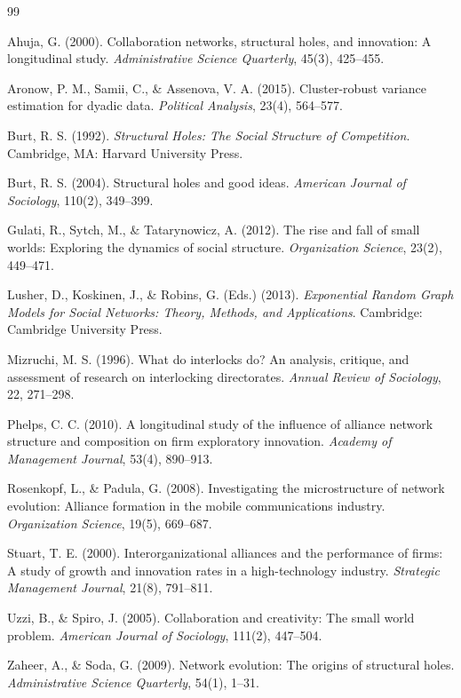 \documentclass[12pt]{article}
\begin{document}
\singlespacing
\begin{thebibliography}{99}
\small

Ahuja, G. (2000). Collaboration networks, structural holes, and innovation: A longitudinal study. \textit{Administrative Science Quarterly}, 45(3), 425--455.

Aronow, P. M., Samii, C., \& Assenova, V. A. (2015). Cluster-robust variance estimation for dyadic data. \textit{Political Analysis}, 23(4), 564--577.

Burt, R. S. (1992). \textit{Structural Holes: The Social Structure of Competition}. Cambridge, MA: Harvard University Press.

Burt, R. S. (2004). Structural holes and good ideas. \textit{American Journal of Sociology}, 110(2), 349--399.

Gulati, R., Sytch, M., \& Tatarynowicz, A. (2012). The rise and fall of small worlds: Exploring the dynamics of social structure. \textit{Organization Science}, 23(2), 449--471.

Lusher, D., Koskinen, J., \& Robins, G. (Eds.) (2013). \textit{Exponential Random Graph Models for Social Networks: Theory, Methods, and Applications}. Cambridge: Cambridge University Press.

Mizruchi, M. S. (1996). What do interlocks do? An analysis, critique, and assessment of research on interlocking directorates. \textit{Annual Review of Sociology}, 22, 271--298.

Phelps, C. C. (2010). A longitudinal study of the influence of alliance network structure and composition on firm exploratory innovation. \textit{Academy of Management Journal}, 53(4), 890--913.

Rosenkopf, L., \& Padula, G. (2008). Investigating the microstructure of network evolution: Alliance formation in the mobile communications industry. \textit{Organization Science}, 19(5), 669--687.

Stuart, T. E. (2000). Interorganizational alliances and the performance of firms: A study of growth and innovation rates in a high-technology industry. \textit{Strategic Management Journal}, 21(8), 791--811.

Uzzi, B., \& Spiro, J. (2005). Collaboration and creativity: The small world problem. \textit{American Journal of Sociology}, 111(2), 447--504.

Zaheer, A., \& Soda, G. (2009). Network evolution: The origins of structural holes. \textit{Administrative Science Quarterly}, 54(1), 1--31.

\end{thebibliography}
\end{document}
